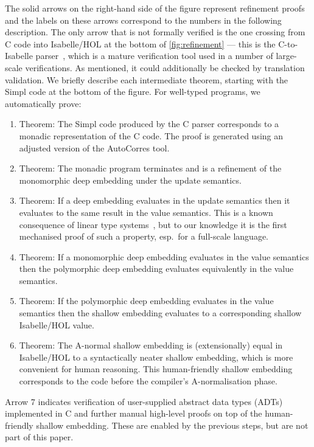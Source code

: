 \documentclass[9pt\ifFinal\else,preprint,nocopyrightspace\fi,\ifAlpha\else natbib,authoryear\fi]{sigplanconf}
\begin{document}
The solid arrows on the right-hand side of the figure represent refinement
proofs and the labels on these arrows correspond to the numbers in the
following description. The only arrow that is not formally verified is the
one crossing from C code into Isabelle/HOL at the bottom of
\autoref{fig:refinement} --- this is the C-to-Isabelle parser~\citep{Tuch_KN_07},
which is a mature verification tool used in a number of large-scale
verifications. As mentioned, it could additionally be checked by translation
validation. We briefly describe each intermediate theorem, starting with the
Simpl code at the bottom of the figure. For well-typed \cdsl programs, we
automatically prove:

\begin{enumerate}
  \item Theorem: The Simpl code produced by the C parser corresponds to a
    monadic representation of the C code. The proof is generated using an adjusted version of the AutoCorres tool.
 \item Theorem: The monadic program terminates and is a refinement of the monomorphic \CDSL deep embedding 
    under the update semantics.
 \item Theorem: If a \CDSL deep embedding evaluates in the update
semantics then it evaluates to the same result in the value semantics.
This is a known consequence of linear type systems~\citep{Hofmann_00}, but to our knowledge
it is the first mechanised proof of such a property, esp.\ for a full-scale language.
 \item Theorem: If a monomorphic \CDSL deep embedding evaluates in the value semantics 
     then the polymorphic deep embedding evaluates equivalently in the value semantics.
 \item Theorem: If the polymorphic \CDSL deep embedding evaluates in the value semantics then 
     the \CDSL shallow embedding evaluates to a corresponding shallow Isabelle/HOL value.
 \item Theorem: The A-normal shallow embedding is (extensionally) equal in
Isabelle/HOL to a syntactically neater shallow embedding, which is more
convenient for human reasoning. This human-friendly shallow embedding
corresponds to the \CDSL code before the compiler's A-normalisation phase.
\end{enumerate}

\noindent
Arrow 7 indicates verification of user-supplied abstract data types
(ADTs) implemented in C and further manual high-level proofs on top of the
human-friendly shallow embedding. These are enabled by the previous steps,
but are not part of this paper.
\end{document}
